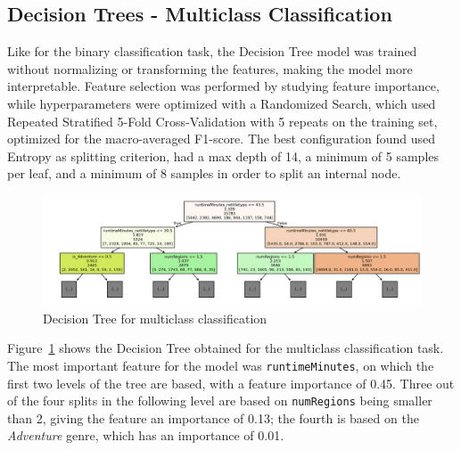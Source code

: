 \subsection{Decision Trees - Multiclass Classification}
Like for the binary classification task, the Decision Tree model was trained without normalizing or
transforming the features, making the model more interpretable. Feature selection was performed by studying
feature importance, while hyperparameters were optimized with a Randomized Search,
which used Repeated Stratified 5-Fold Cross-Validation with 5 repeats on the training set, optimized for
the macro-averaged F1-score.
The best configuration found used Entropy as splitting criterion, had a max depth of 14, a minimum of
5 samples per leaf, and a minimum of 8 samples in order to split an internal node.
\begin{figure}[H]
    \centering
    \includegraphics[width=0.88\linewidth]{plots/multiclass_tree.png}
    \captionsetup{justification=centering, width=0.9\linewidth}
    \caption{Decision Tree for multiclass classification}
    \label{fig:multiclass_dt}
\end{figure}
Figure~\ref{fig:multiclass_dt} shows the Decision Tree obtained for the multiclass classification task.
The most important feature for the model was \texttt{runtimeMinutes}, on which the first two levels
of the tree are based, with a feature importance of 0.45.
Three out of the four splits in the following level are based on \texttt{numRegions} being smaller than
2, giving the feature an importance of 0.13; the fourth is based on the \textit{Adventure} genre,
which has an importance of 0.01.
